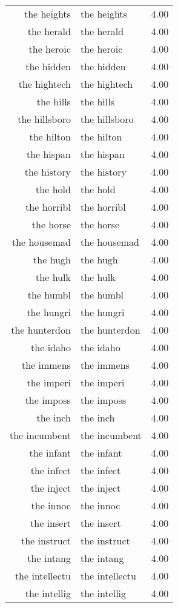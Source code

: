 \begin{table}[ht]
\begin{tabular}{rlr}
  the heights & the heights & 4.00 \\ 
  the herald & the herald & 4.00 \\ 
  the heroic & the heroic & 4.00 \\ 
  the hidden & the hidden & 4.00 \\ 
  the hightech & the hightech & 4.00 \\ 
  the hills & the hills & 4.00 \\ 
  the hillsboro & the hillsboro & 4.00 \\ 
  the hilton & the hilton & 4.00 \\ 
  the hispan & the hispan & 4.00 \\ 
  the history & the history & 4.00 \\ 
  the hold & the hold & 4.00 \\ 
  the horribl & the horribl & 4.00 \\ 
  the horse & the horse & 4.00 \\ 
  the housemad & the housemad & 4.00 \\ 
  the hugh & the hugh & 4.00 \\ 
  the hulk & the hulk & 4.00 \\ 
  the humbl & the humbl & 4.00 \\ 
  the hungri & the hungri & 4.00 \\ 
  the hunterdon & the hunterdon & 4.00 \\ 
  the idaho & the idaho & 4.00 \\ 
  the immens & the immens & 4.00 \\ 
  the imperi & the imperi & 4.00 \\ 
  the imposs & the imposs & 4.00 \\ 
  the inch & the inch & 4.00 \\ 
  the incumbent & the incumbent & 4.00 \\ 
  the infant & the infant & 4.00 \\ 
  the infect & the infect & 4.00 \\ 
  the inject & the inject & 4.00 \\ 
  the innoc & the innoc & 4.00 \\ 
  the insert & the insert & 4.00 \\ 
  the instruct & the instruct & 4.00 \\ 
  the intang & the intang & 4.00 \\ 
  the intellectu & the intellectu & 4.00 \\ 
  the intellig & the intellig & 4.00 \\ 

\end{tabular}
\end{table}
